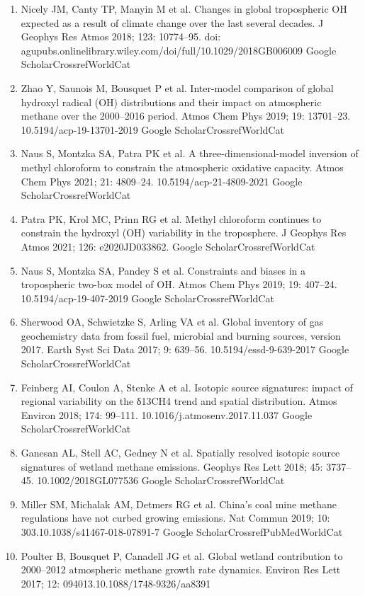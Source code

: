 \documentclass[a4paper,12pt]{article}
\begin{document}
{\begin{thebibliography}{}
\begin{enumerate}
    Google ScholarCrossrefWorldCat 
    \item	Nicely JM, Canty TP, Manyin M et al.  Changes in global tropospheric OH expected as a result of climate change over the last several decades. J Geophys Res Atmos 2018; 123: 10774–95. doi: agupubs.onlinelibrary.wiley.com/doi/full/10.1029/2018GB006009
    Google ScholarCrossrefWorldCat 
    \item	Zhao Y, Saunois M, Bousquet P et al.  Inter-model comparison of global hydroxyl radical (OH) distributions and their impact on atmospheric methane over the 2000–2016 period. Atmos Chem Phys 2019; 19: 13701–23. 10.5194/acp-19-13701-2019
    Google ScholarCrossrefWorldCat 
    \item	Naus S, Montzka SA, Patra PK et al.  A three-dimensional-model inversion of methyl chloroform to constrain the atmospheric oxidative capacity. Atmos Chem Phys 2021; 21: 4809–24. 10.5194/acp-21-4809-2021
    Google ScholarCrossrefWorldCat 
    \item	Patra PK, Krol MC, Prinn RG et al.  Methyl chloroform continues to constrain the hydroxyl (OH) variability in the troposphere. J Geophys Res Atmos 2021; 126: e2020JD033862.
    Google ScholarCrossrefWorldCat 
    \item	Naus S, Montzka SA, Pandey S et al.  Constraints and biases in a tropospheric two-box model of OH. Atmos Chem Phys 2019; 19: 407–24. 10.5194/acp-19-407-2019
    Google ScholarCrossrefWorldCat 
    \item	Sherwood OA, Schwietzke S, Arling VA et al.  Global inventory of gas geochemistry data from fossil fuel, microbial and burning sources, version 2017. Earth Syst Sci Data 2017; 9: 639–56. 10.5194/essd-9-639-2017
    Google ScholarCrossrefWorldCat 
    \item	Feinberg AI, Coulon A, Stenke A et al.  Isotopic source signatures: impact of regional variability on the δ13CH4 trend and spatial distribution. Atmos Environ 2018; 174: 99–111. 10.1016/j.atmosenv.2017.11.037
    Google ScholarCrossrefWorldCat 
    \item	Ganesan AL, Stell AC, Gedney N et al.  Spatially resolved isotopic source signatures of wetland methane emissions. Geophys Res Lett 2018; 45: 3737–45. 10.1002/2018GL077536
    Google ScholarCrossrefWorldCat 
    \item	Miller SM, Michalak AM, Detmers RG et al.  China's coal mine methane regulations have not curbed growing emissions. Nat Commun 2019; 10: 303.10.1038/s41467-018-07891-7
    Google ScholarCrossrefPubMedWorldCat 
    \item	Poulter B, Bousquet P, Canadell JG et al.  Global wetland contribution to 2000–2012 atmospheric methane growth rate dynamics. Environ Res Lett 2017; 12: 094013.10.1088/1748-9326/aa8391

\end{enumerate}
\end{thebibliography}}
\end{document}
